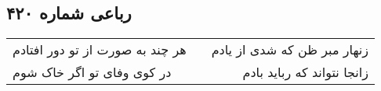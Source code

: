 \begin{center}
\section*{رباعی شماره ۴۲۰}
\label{sec:sh420}
\begin{longtable}{l p{0.5cm} r}
هر چند به صورت از تو دور افتادم
&&
زنهار مبر ظن که شدی از یادم
\\
در کوی وفای تو اگر خاک شوم
&&
زانجا نتواند که رباید بادم
\\
\end{longtable}
\end{center}
